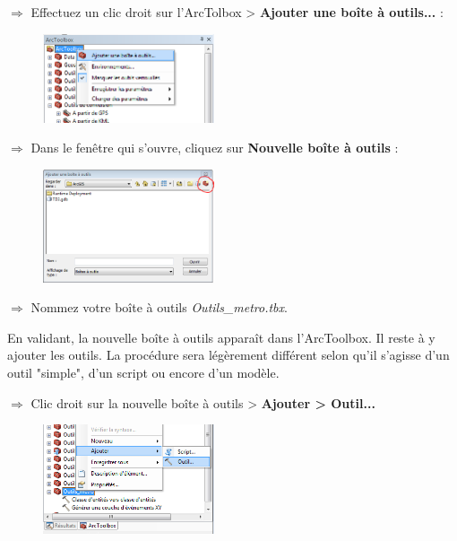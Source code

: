 \documentclass[11pt]{article}
\newcommand{\action}{$\Rightarrow$ }
\begin{document}
\action Effectuez un clic droit sur l'ArcTolbox > \textbf{Ajouter une boîte à outils...} :
\begin{figure}[H]
	\center \includegraphics[width=0.45\textwidth]{img/td3/arctoolbox_ajouter.png}\\
\end{figure}

\action Dans le fenêtre qui s'ouvre, cliquez sur \textbf{Nouvelle boîte à outils} :
\begin{figure}[H]
	\center \includegraphics[width=0.45\textwidth]{img/td3/arctoolbox_ajouter-2.png}\\
\end{figure}

\action Nommez votre boîte à outils \textit{Outils\_metro.tbx}.

En validant, la nouvelle boîte à outils apparaît dans l'ArcToolbox. Il reste à y ajouter les outils. La procédure sera légèrement différent selon qu'il s'agisse d'un outil "simple", d'un script ou encore d'un modèle.

\action Clic droit sur la nouvelle boîte à outils > \textbf{Ajouter > Outil...}
\begin{figure}[H]
	\center \includegraphics[width=0.45\textwidth]{img/td3/arctoolbox_ajouter-3.png}\\
\end{figure}
\end{document}
